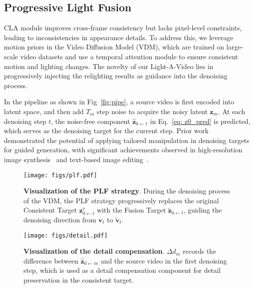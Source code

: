 \subsection{Progressive Light Fusion}
\label{sec:PLF}

CLA module improves cross-frame consistency but lacks pixel-level constraints, 
leading to inconsistencies in appearance details.
To address this, we leverage motion priors in the Video Diffusion Model (VDM), 
which are trained on large-scale video datasets and use a temporal attention module
to ensure consistent motion and lighting changes.
The novelty of our Light-A-Video lies in 
progressively injecting the relighting results
as guidance into the denoising process.

In the pipeline as shown in Fig~\ref{fig:pipe},
a source video is first encoded into latent space, 
and then add $T_m$ step noise to acquire the noisy latent $\mathbf{z}_m$.
At each denoising step $t$,
the noise-free component $\hat{\mathbf{z}}_{0 \gets t}$ 
in Eq.~\ref{eq: z0_pred} is predicted, which serves as the denoising target for the current step.
Prior work demonstrated the potential of applying tailored manipulation in denoising targets for guided generation, 
with significant achievements observed in high-resolution image synthesis~\cite{kim2024diffusehigh} 
and text-based image editing~\cite{rout2024rfinversion}.

\begin{figure}
\centering
\texttt{[image: figs/plf.pdf]}
\vspace{-0.5em}
\caption{{\bf Visualization of the PLF strategy}. 
During the denoising process of the VDM, the PLF strategy progressively
replaces the original Consistent Target $\mathbf{z}^{v}_{0 \gets t}$ with the Fusion Target $\tilde{\mathbf{z}}_{0 \gets t}$,
guiding the denoising direction from  $ \mathbf{v}_t$ to $\tilde{\mathbf{v}}_t$.
}
\label{fig:plf}
\vspace{-0.5em}
\end{figure}

\begin{figure}
\centering
\texttt{[image: figs/detail.pdf]}
\vspace{-1.9em}
\caption{{\bf Visualization of the detail compensation}. 
$\Delta d_m$ records the difference between $\hat{\mathbf{z}}_{0 \gets m}$ and the source video in the first denoising step, which is used
as a detail compensation component for detail preservation in the consistent target.
}
\label{fig:detail}
\vspace{-1.5em}
\end{figure}


